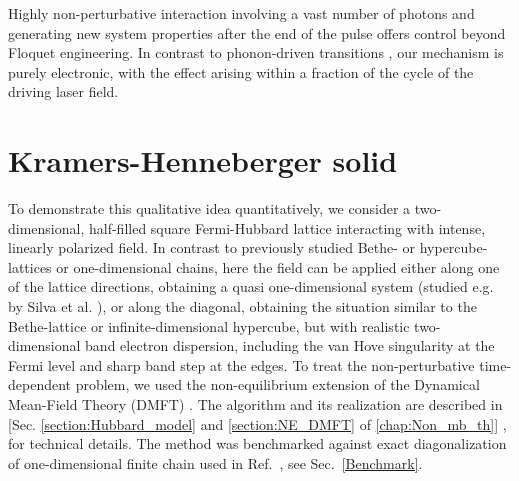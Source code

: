 
Highly non-perturbative interaction involving a vast number of photons and generating new system properties after the end of the pulse offers control beyond Floquet engineering.  
In contrast to phonon-driven transitions \cite{Cavalleri_2011}, 
our mechanism is purely electronic, with the effect arising
within a fraction of the cycle of the driving laser field.

\section{Kramers-Henneberger solid}

To demonstrate this qualitative idea quantitatively, 
we consider a two-dimensional, half-filled square 
Fermi-Hubbard lattice interacting with intense,
linearly polarized field. In contrast to previously studied 
Bethe- or hypercube-lattices \cite{PhysRevLett.106.236401,PhysRevB.91.245153} or one-dimensional chains\cite{Rui}, here the field can be applied either along one of the lattice directions, obtaining a quasi one-dimensional system (studied e.g. by Silva et al. \cite{Rui}), or along the diagonal, obtaining the situation similar to the Bethe-lattice or infinite-dimensional hypercube, but with realistic two-dimensional band electron dispersion, including the van Hove singularity at the Fermi level and sharp band step at the edges. To treat the non-perturbative 
time-dependent problem, we used the non-equilibrium 
extension \cite{schmidt2002,RevModPhys.86.779} of 
the Dynamical Mean-Field Theory (DMFT) \cite{RevModPhys.68.13}.
The algorithm and its realization are described in [Sec. \ref{section:Hubbard_model} and \ref{section:NE_DMFT} of \autoref{chap:Non_mb_th}] \cite{PhysRevB.81.115131}, for technical details. The method was benchmarked 
against exact diagonalization of one-dimensional finite 
chain used in Ref.~\cite{Rui}, see Sec.~\ref{Benchmark}.

